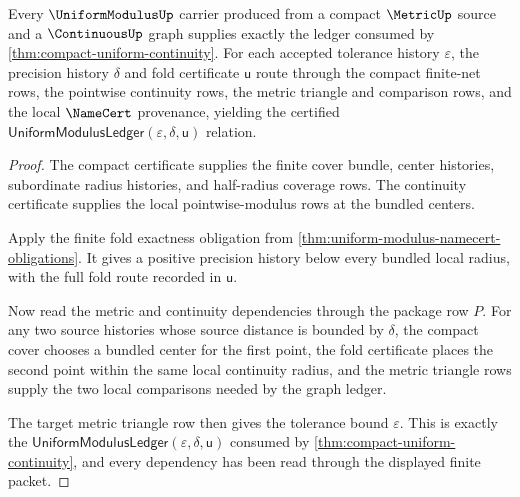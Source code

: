 \begin{theorem}
\label{thm:uniform-modulus-compact-continuous-handoff}
Every $\UniformModulusUp$ carrier produced from a compact $\MetricUp$ source and
a $\ContinuousUp$ graph supplies exactly the ledger consumed by
\autoref{thm:compact-uniform-continuity}. For each accepted tolerance history
$\varepsilon$, the precision history $\delta$ and fold certificate
$\mathsf{u}$ route through the compact finite-net rows, the pointwise continuity
rows, the metric triangle and comparison rows, and the local $\NameCert$
provenance, yielding the certified
$\mathsf{UniformModulusLedger}(\varepsilon,\delta,\mathsf{u})$ relation.
\end{theorem}
\begin{proof}
The compact certificate supplies the finite cover bundle, center histories,
subordinate radius histories, and half-radius coverage rows. The continuity
certificate supplies the local pointwise-modulus rows at the bundled centers.

Apply the finite fold exactness obligation from
\autoref{thm:uniform-modulus-namecert-obligations}. It gives a positive
precision history below every bundled local radius, with the full fold route
recorded in $\mathsf{u}$.

Now read the metric and continuity dependencies through the package row $P$.
For any two source histories whose source distance is bounded by $\delta$, the
compact cover chooses a bundled center for the first point, the fold certificate
places the second point within the same local continuity radius, and the metric
triangle rows supply the two local comparisons needed by the graph ledger.

The target metric triangle row then gives the tolerance bound
$\varepsilon$. This is exactly the
$\mathsf{UniformModulusLedger}(\varepsilon,\delta,\mathsf{u})$ consumed by
\autoref{thm:compact-uniform-continuity}, and every dependency has been read
through the displayed finite packet.
\end{proof}
